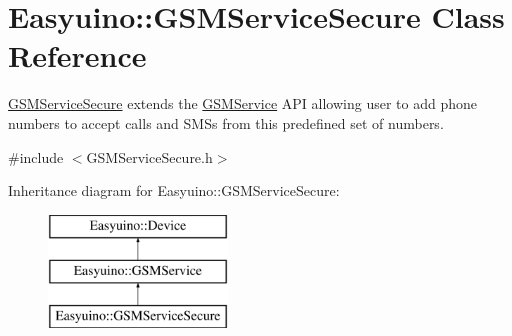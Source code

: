 \hypertarget{class_easyuino_1_1_g_s_m_service_secure}{}\section{Easyuino\+:\+:G\+S\+M\+Service\+Secure Class Reference}
\label{class_easyuino_1_1_g_s_m_service_secure}


\hyperlink{class_easyuino_1_1_g_s_m_service_secure}{G\+S\+M\+Service\+Secure} extends the \hyperlink{class_easyuino_1_1_g_s_m_service}{G\+S\+M\+Service} A\+PI allowing user to add phone numbers to accept calls and S\+M\+Ss from this predefined set of numbers.  




{\ttfamily \#include $<$G\+S\+M\+Service\+Secure.\+h$>$}

Inheritance diagram for Easyuino\+:\+:G\+S\+M\+Service\+Secure\+:\begin{figure}[H]
\begin{center}
\leavevmode
\includegraphics[height=3.000000cm]{class_easyuino_1_1_g_s_m_service_secure}
\end{center}
\end{figure}
